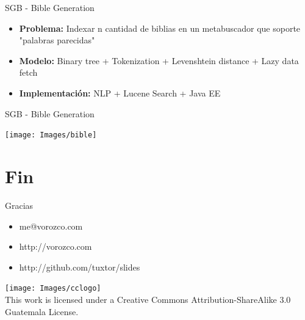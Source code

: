 \documentclass{beamer}
\begin{document}
\begin{frame}{SGB - Bible Generation}
    \begin{itemize}
        \item \textbf{Problema:} Indexar n cantidad de biblias en un metabuscador que soporte "palabras parecidas"
        \item \textbf{Modelo: } Binary tree + Tokenization + Levenshtein distance + Lazy data fetch
         \item \textbf{Implementación: } NLP + Lucene Search + Java EE 
    \end{itemize}
\end{frame}

\begin{frame}{SGB - Bible Generation}
    \begin{center}
        \texttt{[image: Images/bible]}
    \end{center}
\end{frame}


\section{Fin}

\begin{frame}{Gracias}
\begin{itemize}
\item me@vorozco.com
\item http://vorozco.com
\item http://github.com/tuxtor/slides
\end{itemize}
\begin{center}
\texttt{[image: Images/cclogo]}
\\
This work is licensed under a Creative Commons Attribution-ShareAlike 3.0 Guatemala License.
\end{center}
\end{frame}
\end{document}
